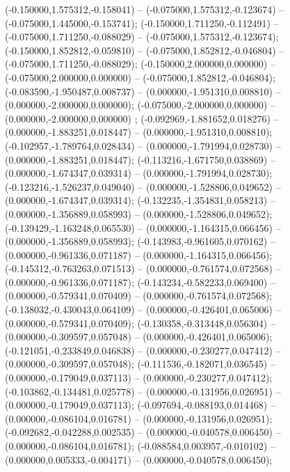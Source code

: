  (-0.150000,1.575312,-0.158041) -- (-0.075000,1.575312,-0.123674) -- (-0.075000,1.445000,-0.153741);
 (-0.150000,1.711250,-0.112491) -- (-0.075000,1.711250,-0.088029) -- (-0.075000,1.575312,-0.123674);
 (-0.150000,1.852812,-0.059810) -- (-0.075000,1.852812,-0.046804) -- (-0.075000,1.711250,-0.088029);
 (-0.150000,2.000000,0.000000) -- (-0.075000,2.000000,0.000000) -- (-0.075000,1.852812,-0.046804);
 (-0.083590,-1.950487,0.008737) -- (0.000000,-1.951310,0.008810) -- (0.000000,-2.000000,0.000000);
 (-0.075000,-2.000000,0.000000) -- (0.000000,-2.000000,0.000000) ;
 (-0.092969,-1.881652,0.018276) -- (0.000000,-1.883251,0.018447) -- (0.000000,-1.951310,0.008810);
 (-0.102957,-1.789764,0.028434) -- (0.000000,-1.791994,0.028730) -- (0.000000,-1.883251,0.018447);
 (-0.113216,-1.671750,0.038869) -- (0.000000,-1.674347,0.039314) -- (0.000000,-1.791994,0.028730);
 (-0.123216,-1.526237,0.049040) -- (0.000000,-1.528806,0.049652) -- (0.000000,-1.674347,0.039314);
 (-0.132235,-1.354831,0.058213) -- (0.000000,-1.356889,0.058993) -- (0.000000,-1.528806,0.049652);
 (-0.139429,-1.163248,0.065530) -- (0.000000,-1.164315,0.066456) -- (0.000000,-1.356889,0.058993);
 (-0.143983,-0.961605,0.070162) -- (0.000000,-0.961336,0.071187) -- (0.000000,-1.164315,0.066456);
 (-0.145312,-0.763263,0.071513) -- (0.000000,-0.761574,0.072568) -- (0.000000,-0.961336,0.071187);
 (-0.143234,-0.582233,0.069400) -- (0.000000,-0.579341,0.070409) -- (0.000000,-0.761574,0.072568);
 (-0.138032,-0.430043,0.064109) -- (0.000000,-0.426401,0.065006) -- (0.000000,-0.579341,0.070409);
 (-0.130358,-0.313448,0.056304) -- (0.000000,-0.309597,0.057048) -- (0.000000,-0.426401,0.065006);
 (-0.121051,-0.233849,0.046838) -- (0.000000,-0.230277,0.047412) -- (0.000000,-0.309597,0.057048);
 (-0.111536,-0.182071,0.036545) -- (0.000000,-0.179049,0.037113) -- (0.000000,-0.230277,0.047412);
 (-0.103862,-0.134481,0.025778) -- (0.000000,-0.131956,0.026951) -- (0.000000,-0.179049,0.037113);
 (-0.097694,-0.088193,0.014468) -- (0.000000,-0.086104,0.016781) -- (0.000000,-0.131956,0.026951);
 (-0.092682,-0.042288,0.002535) -- (0.000000,-0.040578,0.006450) -- (0.000000,-0.086104,0.016781);
 (-0.088584,0.003957,-0.010102) -- (0.000000,0.005333,-0.004171) -- (0.000000,-0.040578,0.006450);
